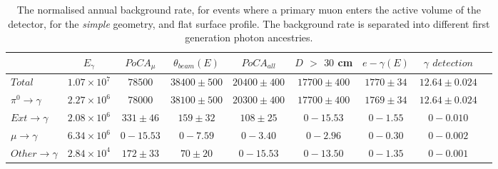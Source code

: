 \begin{table}[h!]
  \caption[The normalised annual background rate, for events where a primary muon enters the active volume of the detector, for the \emph{simple} geometry, and flat surface profile]
          {The normalised annual background rate, for events where a primary muon enters the active volume of the detector, for the \emph{simple} geometry, and flat surface profile. The background rate is separated into different first generation photon ancestries.}
  \label{tab:SurfMuSimp}
  \centering
  \scriptsize
  \begin{tabular}{l c c c c c c c c }
    \toprule
        & $E_\gamma$ & $PoCA_\mu$ & $\theta_{beam}(E)$ & $PoCA_{all}$ & $D$ $>$ $30$ cm & $e-\gamma(E)$ & $\gamma$ $detection$ \\
        \midrule
        $Total$          & $1.07\times10^7$ & $78500$    & $38400\pm500$ & $20400\pm400$ & $17700\pm400$ & $1770\pm34$ & $12.64\pm0.024$ \\

        $\pi^0\to\gamma$ & $2.27\times10^6$ & $78000$    & $38100\pm500$ & $20300\pm400$ & $17700\pm400$ & $1769\pm34$ & $12.64\pm0.024$ \\

        $Ext\to\gamma$   & $2.08\times10^6$ & $331\pm46$ & $159\pm32$    & $108\pm25$    & $0-15.53$     & $0-1.55$    & $0-0.010$ \\

        $\mu\to\gamma$   & $6.34\times10^6$ & $0-15.53$  & $0-7.59$      & $0-3.40$      & $0-2.96$      & $0-0.30$    & $0-0.002$ \\

        $Other\to\gamma$ & $2.84\times10^4$ & $172\pm33$ & $70\pm20$     & $0-15.53$     & $0-13.50$     & $0-1.35$    & $0-0.001$ \\
        \bottomrule
  \end{tabular}
\end{table}


